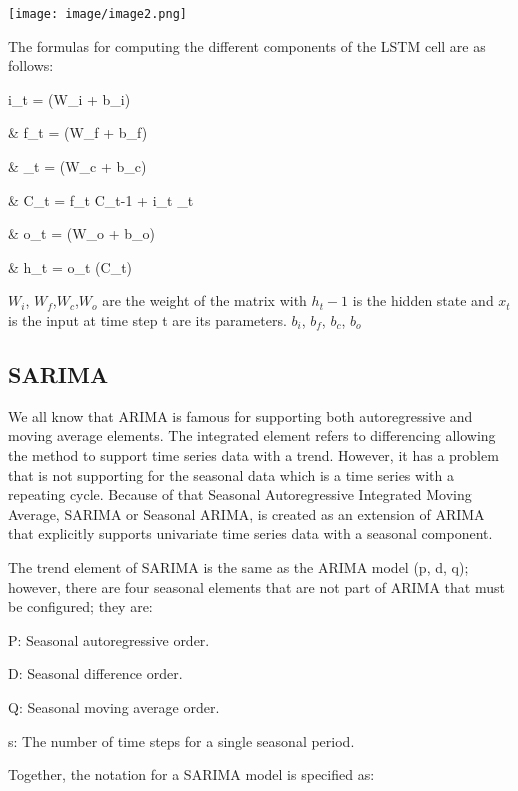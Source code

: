 \documentclass{ieeeojies}
\begin{document}
\texttt{[image: image/image2.png]}

The formulas for computing the different
components of the LSTM cell are as follows:


     \quad i_t = \sigma(W_i \ast [h_{t-1}, x_t] + b_i)
    
     \quad & f_t = \sigma(W_f \ast [h_{t-1}, x_t] + b_f) 
    
     \quad & _t = \tanh(W_c \ast [h_{t-1}, x_t] + b_c) 
    
     \quad & C_t = f_t \ast C_{t-1} + i_t \ast {}_t 
    
     \quad & o_t = \sigma(W_o \ast [h_{t-1}, x_t] + b_o) 
    
     \quad & h_t = o_t \ast \tanh(C_t)

\( W_i \), \( W_f \),\( W_c \),\( W_o \) are the weight of the matrix with \(h_t-1\) is the hidden state and \(x_t\) is the input at time step t are its parameters. \(b_i\), \(b_f\), \(b_c\), \(b_o\)
\subsection{SARIMA}

\hspace{0.3cm}We all know that ARIMA is famous for supporting both
autoregressive and moving average elements. The integrated
element refers to differencing allowing the method to support
time series data with a trend. However, it has a problem that is
not supporting for the seasonal data which is a time series with
a repeating cycle. Because of that Seasonal Autoregressive
Integrated Moving Average, SARIMA or Seasonal ARIMA, is
created as an extension of ARIMA that explicitly supports
univariate time series data with a seasonal component.

The trend element of SARIMA is the same as the ARIMA
model (p, d, q); however, there are four seasonal elements that
are not part of ARIMA that must be configured; they are:

P: Seasonal autoregressive order.

D: Seasonal difference order.

Q: Seasonal moving average order.

s: The number of time steps for a single seasonal period.

Together, the notation for a SARIMA model is specified as:
\end{document}

